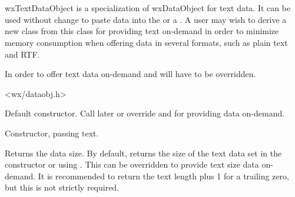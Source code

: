 \section{}\label{wxtextdataobject}

wxTextDataObject is a specialization of wxDataObject for text data. It can be
used without change to paste data into the 
or a . A user may wish to derive a new class
from this class for providing text on-demand in order to minimize memory consumption
when offering data in several formats, such as plain text and RTF.

In order to offer text data on-demand  
and  will have to be overridden.




<wx/dataobj.h>




\label{wxtextdataobjectwxtextdataobject}


Default constructor. Call  later
or override  and 
 for providing data on-demand.


Constructor, passing text.

\label{wxtextdataobjectgetsize}


Returns the data size. By default, returns the size of the text data
set in the constructor or using .
This can be overridden to provide text size data on-demand. It is recommended
to return the text length plus 1 for a trailing zero, but this is not
strictly required.

\label{wxtextdataobjectgettext}

